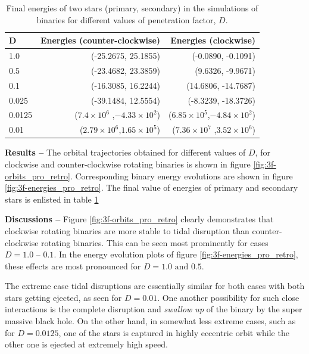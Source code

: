 \documentclass[a4paper]{article}
\begin{document}
\begin{enumerate} [label*=\textbf{(\alph*)}]
				\begin{table}
					\centering
					\begin{tabular} {l r r}
						\toprule
						\textbf{D} & \textbf{Energies (counter-clockwise)} & \textbf{Energies (clockwise)} \\
						\midrule
						1.0 & (-25.2675, 25.1855) & (-0.0890, -0.1091) \\
						0.5 & (-23.4682, 23.3859) & (9.6326, -9.9671) \\
						0.1 & (-16.3085, 16.2244) & (14.6806, -14.7687) \\
						0.025 & (-39.1484, 12.5554) & (-8.3239, -18.3726) \\
						0.0125 & (\(7.4 \times 10^6\) ,\(-4.33 \times 10^2\)) &  (\(6.85 \times 10^5\),\(-4.84 \times 10^2\)) \\
						0.01 & (\(2.79 \times 10^6\),\(1.65 \times 10^5\)) & (\(7.36 \times 10^7\)  ,\(3.52 \times 10^6\)) \\
						\bottomrule
					\end{tabular}
					\caption{Final energies of two stars (primary, secondary) in the simulations of binaries for different values of penetration factor, \(D\).}
					\label{table:3f-final_energies_d}
				\end{table}
				
				\subitem \textbf{Results --}
				The orbital trajectories obtained for different values of \(D\), for clockwise and counter-clockwise rotating binaries is shown in figure \ref{fig:3f-orbits_pro_retro}. Corresponding binary energy evolutions are shown in figure \ref{fig:3f-energies_pro_retro}. The final value of energies of primary and secondary stars is enlisted in table \ref{table:3f-final_energies_d}
				
				\subitem \textbf{Discussions --}
				Figure \ref{fig:3f-orbits_pro_retro} clearly demonstrates that clockwise rotating binaries are more stable to tidal disruption than counter-clockwise rotating binaries. This can be seen most prominently for cases \(D=1.0\text{ -- }0.1\).
				In the energy evolution plots of figure \ref{fig:3f-energies_pro_retro}, these effects are most pronounced for \(D=1.0\text{ and }0.5\).
				
				The extreme case tidal disruptions are essentially similar for both cases with both stars getting ejected, as seen for \(D=0.01\). One another possibility for such close interactions is the complete disruption and \emph{swallow up} of the binary by the super massive black hole. On the other hand, in somewhat less extreme cases, such as for \(D=0.0125\), one of the stars is captured in highly eccentric orbit while the other one is ejected at extremely high speed.
				

\end{enumerate}
\end{document}
